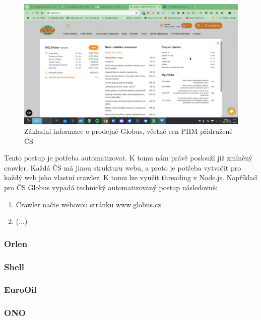 \begin{figure}
    \centering
    \includegraphics[width=0.75\linewidth]{Figures/globus_vyber.jpg}
    \caption{Základní informace o prodejně Globus, včetně cen PHM
        přidružené ČS}
    \label{fig:globus-cs}
\end{figure}

Tento postup je potřeba automatizovat. K tomu nám právě poslouží již
zmíněný crawler. Každá ČS má jinou strukturu webu, a proto je potřeba
vytvořit pro každý web jeho vlastní crawler. K tomu lze využít threading
v Node.js. Například pro ČS Globus vypadá technický automatizovaný postup
následovně:

\begin{enumerate}
    \item Crawler načte webovou stránku www.globus.cz
    \item (...) %
\end{enumerate}

\subsubsection{Orlen}


\subsubsection{Shell}


\subsubsection{EuroOil}


\subsubsection{ONO}

